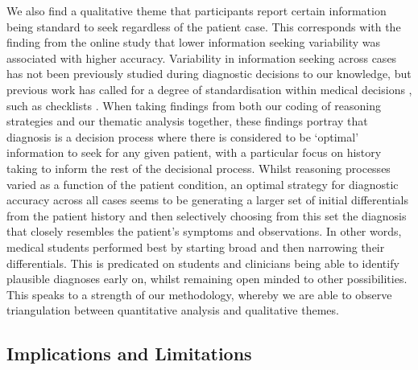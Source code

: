 \documentclass[a4paper, nobind]{templates/ociamthesis}
\begin{document}
We also find a qualitative theme that participants report certain information being standard to seek regardless of the patient case. This corresponds with the finding from the online study that lower information seeking variability was associated with higher accuracy. Variability in information seeking across cases has not been previously studied during diagnostic decisions to our knowledge, but previous work has called for a degree of standardisation within medical decisions \autocite{wears_standardisation_2015}, such as checklists \autocite{ely_checklists_2011}. When taking findings from both our coding of reasoning strategies and our thematic analysis together, these findings portray that diagnosis is a decision process where there is considered to be `optimal' information to seek for any given patient, with a particular focus on history taking to inform the rest of the decisional process. Whilst reasoning processes varied as a function of the patient condition, an optimal strategy for diagnostic accuracy across all cases seems to be generating a larger set of initial differentials from the patient history and then selectively choosing from this set the diagnosis that closely resembles the patient's symptoms and observations. In other words, medical students performed best by starting broad and then narrowing their differentials. This is predicated on students and clinicians being able to identify plausible diagnoses early on, whilst remaining open minded to other possibilities. This speaks to a strength of our methodology, whereby we are able to observe triangulation between quantitative analysis and qualitative themes.

\subsection{Implications and Limitations}\label{implications-and-limitations}
\end{document}
